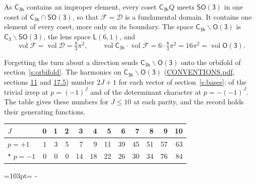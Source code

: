 \documentclass[10pt,a4paper]{article}
\newcommand{\needspace}[1]{\par\penalty-100\begingroup\dimen0=#1\relax\dimen2=\pagegoal
  \advance\dimen2-\pagetotal\ifdim\dimen0>\dimen2\relax\ifdim\dimen2>0pt\vfil\break\fi\fi
  \endgroup}
\numberwithin{equation}{section}
\newcommand{\grp}[1]{\mathsf{#1}}
\newcommand{\vol}{\operatorname{vol}}
\newcommand{\fcell}{\mathcal{D}}
\newcommand{\fdomain}{\mathcal{F}}
\newcommand{\lensspace}[2]{\mathsf{L}(#1, #2)}
\begin{document}
\leavevmode\label{n:set.fundamental}As $\grp{C_{3h}}$ contains an improper element, every coset $\grp{C_{3h}}Q$ meets \href{SO3.pdf}{$\grp{SO(3)}$} in one coset of $\grp{C_{3h}} \cap \grp{SO(3)}$, so that $\fdomain = \fcell$ is a fundamental domain. It contains one element of every coset, more only on its boundary.
\leavevmode\label{n:set.lens}The space $\grp{C_{3h}}\backslash\grp{O(3)}$ is $\grp{C_{3}}\backslash\grp{SO(3)}$, the lens space $\lensspace{6}{1}$, and
\begin{equation}\label{e:volume}\vol\fdomain = \vol\fcell = \tfrac{8}{3}\pi^2,\qquad \vol\grp{C_{3h}}\cdot\vol\fdomain = 6\cdot \tfrac{8}{3}\pi^2 = 16\pi^2 = \vol\grp{O(3)}.\end{equation}

Forgetting the turn about a direction sends $\grp{C_{3h}}\backslash\grp{O(3)}$ onto the orbifold of section~\ref{s:orbifold}.
The harmonics on $\grp{C_{3h}}\backslash\grp{O(3)}$ (\href{../../CONVENTIONS.pdf}{CONVENTIONS.pdf}, sections \href{../../CONVENTIONS.pdf\#conv.11}{11} and \href{../../CONVENTIONS.pdf\#conv.17.5}{17.5}) number $2J + 1$ for each vector of section~\ref{s:bases}: of the trivial irrep at $p = (-1)^J$ and of the determinant character at $p = -(-1)^J$. The table gives these numbers for $J \le 10$ at each parity, and the record holds their generating functions.
{\small\setlength{\tabcolsep}{4pt}\begin{longtable}{@{}lrrrrrrrrrrr@{}}\toprule
$J$ & 0 & 1 & 2 & 3 & 4 & 5 & 6 & 7 & 8 & 9 & 10\\\midrule\endhead
\bottomrule\endfoot\endlastfoot
$p = +1$ & 1 & 3 & 5 & 7 & 9 & 11 & 39 & 45 & 51 & 57 & 63\\*
$p = -1$ & 0 & 0 & 0 & 14 & 18 & 22 & 26 & 30 & 34 & 76 & 84\\
\bottomrule\end{longtable}}
\needspace{103pt}
\end{document}
